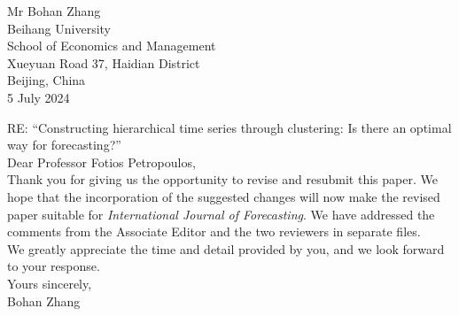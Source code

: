 \documentclass[a4paper,12pt]{amsart}
\begin{document}
\begin{flushright}
Mr Bohan Zhang\\
Beihang University\\
School of Economics and Management\\%
Xueyuan Road 37, Haidian District \\
Beijing, China\\
5 July 2024
\end{flushright}

\bigskip
RE: ``Constructing hierarchical time series through clustering: Is there an optimal way for forecasting?''   \\


Dear Professor Fotios Petropoulos,\\

Thank you for giving us the opportunity to revise and resubmit this paper. We hope that the incorporation of the suggested changes will now make the revised paper suitable for \textit{International Journal of Forecasting}. We have addressed the comments from the Associate Editor and the two reviewers in separate files.    \\

We greatly appreciate the time and detail provided by you, and we look forward to your response.\\

Yours sincerely,\\
Bohan Zhang
\end{document}
